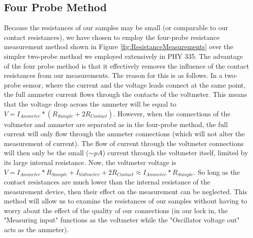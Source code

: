 \documentclass[%
 reprint,
 amsmath,amssymb,
 aps,
 pra,
]{revtex4-1}
\begin{document}
\begin{appendix}

\section{Four Probe Method}\label{section:fourprobe}

Because the resistances of our samples may be small (or comparable to our contact resistances), we have chosen to employ the four-probe resistance measurement method shown in Figure \ref{fig:ResistanceMeasurements} over the simpler two-probe method we employed extensively in PHY 335. The advantage of the four probe method is that it effectively removes the influence of the contact resistances from our measurements. The reason for this is as follows. In a two-probe sensor, where the current and the voltage leads connect at the same point, the full ammeter current flows through the contacts of the voltmeter. This means that the voltage drop across the ammeter will be equal to $V = I_{Ammeter}*(R_{Sample} + 2R_{Contact})$. However, when the connections of the voltmeter and ammeter are separated as in the four-probe method, the full current will only flow through the ammeter connections (which will not alter the measurement of current). The flow of current through the voltmeter connections will then only be the small ($\sim pA$) current through the voltmeter itself, limited by its large internal resistance. Now, the voltmeter voltage is $V = I_{Ammeter}*R_{Sample} + I_{Voltmeter} + 2R_{Contact} \approx I_{Ammeter}*R_{Sample}$. So long as the contact resistances are much lower than the internal resistance of the measurement device, then their effect on the measurement can be neglected. This method will allow us to examine the resistances of our samples without having to worry about the effect of the quality of our connections (in our lock in, the "Measuring input" functions as the voltmeter while the "Oscillator voltage out" acts as the ammeter).


\end{appendix}
\end{document}
